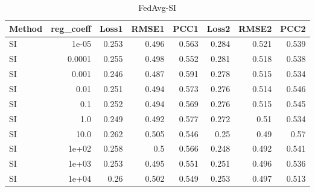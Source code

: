 \begin{table}
\caption{FedAvg-SI}
\begin{tabular}{lrrrrrrr}
\toprule
Method & reg_coeff & Loss1 & RMSE1 & PCC1 & Loss2 & RMSE2 & PCC2 \\
\midrule
SI & 1e-05 & 0.253 & 0.496 & 0.563 & 0.284 & 0.521 & 0.539 \\
SI & 0.0001 & 0.255 & 0.498 & 0.552 & 0.281 & 0.518 & 0.538 \\
SI & 0.001 & 0.246 & 0.487 & 0.591 & 0.278 & 0.515 & 0.534 \\
SI & 0.01 & 0.251 & 0.494 & 0.573 & 0.276 & 0.514 & 0.546 \\
SI & 0.1 & 0.252 & 0.494 & 0.569 & 0.276 & 0.515 & 0.545 \\
SI & 1.0 & 0.249 & 0.492 & 0.577 & 0.272 & 0.51 & 0.534 \\
SI & 10.0 & 0.262 & 0.505 & 0.546 & 0.25 & 0.49 & 0.57 \\
SI & 1e+02 & 0.258 & 0.5 & 0.566 & 0.248 & 0.492 & 0.541 \\
SI & 1e+03 & 0.253 & 0.495 & 0.551 & 0.251 & 0.496 & 0.536 \\
SI & 1e+04 & 0.26 & 0.502 & 0.549 & 0.253 & 0.497 & 0.513 \\
\bottomrule
\end{tabular}
\end{table}

